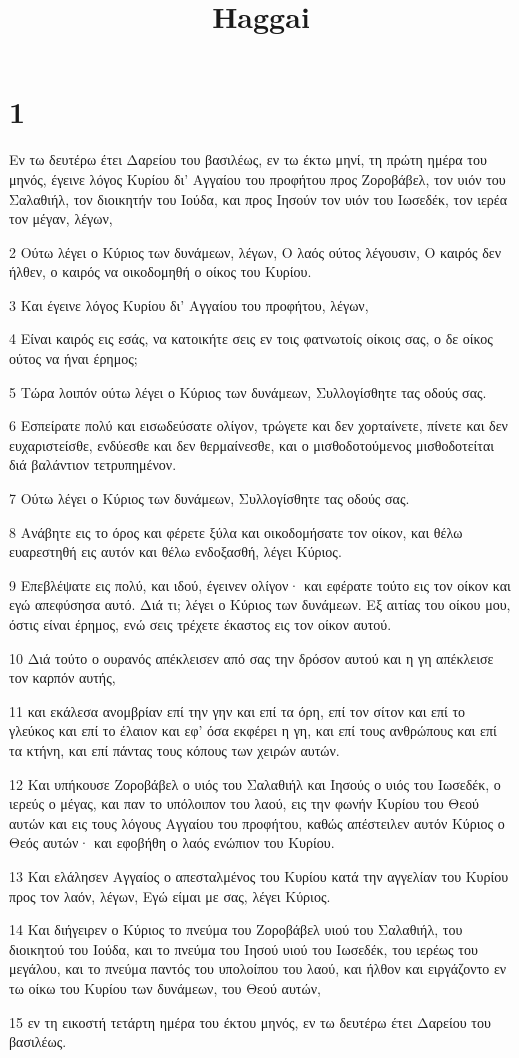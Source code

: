 

\title{Haggai}


\chapter{1}

\par Εν τω δευτέρω έτει Δαρείου του βασιλέως, εν τω έκτω μηνί, τη πρώτη ημέρα του μηνός, έγεινε λόγος Κυρίου δι' Αγγαίου του προφήτου προς Ζοροβάβελ, τον υιόν του Σαλαθιήλ, τον διοικητήν του Ιούδα, και προς Ιησούν τον υιόν του Ιωσεδέκ, τον ιερέα τον μέγαν, λέγων,
\par 2 Ούτω λέγει ο Κύριος των δυνάμεων, λέγων, Ο λαός ούτος λέγουσιν, Ο καιρός δεν ήλθεν, ο καιρός να οικοδομηθή ο οίκος του Κυρίου.
\par 3 Και έγεινε λόγος Κυρίου δι' Αγγαίου του προφήτου, λέγων,
\par 4 Είναι καιρός εις εσάς, να κατοικήτε σεις εν τοις φατνωτοίς οίκοις σας, ο δε οίκος ούτος να ήναι έρημος;
\par 5 Τώρα λοιπόν ούτω λέγει ο Κύριος των δυνάμεων, Συλλογίσθητε τας οδούς σας.
\par 6 Εσπείρατε πολύ και εισωδεύσατε ολίγον, τρώγετε και δεν χορταίνετε, πίνετε και δεν ευχαριστείσθε, ενδύεσθε και δεν θερμαίνεσθε, και ο μισθοδοτούμενος μισθοδοτείται διά βαλάντιον τετρυπημένον.
\par 7 Ούτω λέγει ο Κύριος των δυνάμεων, Συλλογίσθητε τας οδούς σας.
\par 8 Ανάβητε εις το όρος και φέρετε ξύλα και οικοδομήσατε τον οίκον, και θέλω ευαρεστηθή εις αυτόν και θέλω ενδοξασθή, λέγει Κύριος.
\par 9 Επεβλέψατε εις πολύ, και ιδού, έγεινεν ολίγον· και εφέρατε τούτο εις τον οίκον και εγώ απεφύσησα αυτό. Διά τι; λέγει ο Κύριος των δυνάμεων. Εξ αιτίας του οίκου μου, όστις είναι έρημος, ενώ σεις τρέχετε έκαστος εις τον οίκον αυτού.
\par 10 Διά τούτο ο ουρανός απέκλεισεν από σας την δρόσον αυτού και η γη απέκλεισε τον καρπόν αυτής,
\par 11 και εκάλεσα ανομβρίαν επί την γην και επί τα όρη, επί τον σίτον και επί το γλεύκος και επί το έλαιον και εφ' όσα εκφέρει η γη, και επί τους ανθρώπους και επί τα κτήνη, και επί πάντας τους κόπους των χειρών αυτών.
\par 12 Και υπήκουσε Ζοροβάβελ ο υιός του Σαλαθιήλ και Ιησούς ο υιός του Ιωσεδέκ, ο ιερεύς ο μέγας, και παν το υπόλοιπον του λαού, εις την φωνήν Κυρίου του Θεού αυτών και εις τους λόγους Αγγαίου του προφήτου, καθώς απέστειλεν αυτόν Κύριος ο Θεός αυτών· και εφοβήθη ο λαός ενώπιον του Κυρίου.
\par 13 Και ελάλησεν Αγγαίος ο απεσταλμένος του Κυρίου κατά την αγγελίαν του Κυρίου προς τον λαόν, λέγων, Εγώ είμαι με σας, λέγει Κύριος.
\par 14 Και διήγειρεν ο Κύριος το πνεύμα του Ζοροβάβελ υιού του Σαλαθιήλ, του διοικητού του Ιούδα, και το πνεύμα του Ιησού υιού του Ιωσεδέκ, του ιερέως του μεγάλου, και το πνεύμα παντός του υπολοίπου του λαού, και ήλθον και ειργάζοντο εν τω οίκω του Κυρίου των δυνάμεων, του Θεού αυτών,
\par 15 εν τη εικοστή τετάρτη ημέρα του έκτου μηνός, εν τω δευτέρω έτει Δαρείου του βασιλέως.

